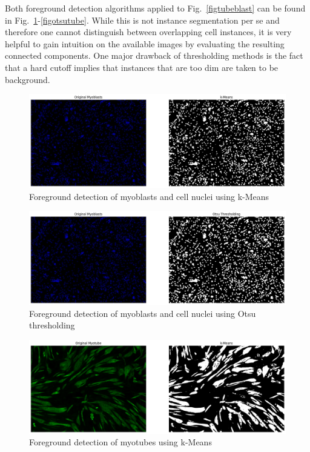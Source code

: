 Both foreground detection algorithms applied to Fig.~\ref{figtubeblast} can be found in Fig.~\ref{figkmblast}-\ref{figotsutube}. While this is not instance segmentation per se and therefore one cannot distinguish between overlapping cell instances, it is very helpful to gain intuition on the available images by evaluating the resulting connected components. One major drawback of thresholding methods is the fact that a hard cutoff implies that instances that are too dim are taken to be background.
\begin{figure}
	\centering
	\includegraphics[width=\textwidth]{"images/km_blast.png"}
	\caption[k-Means applied to nuclei]{Foreground detection of myoblasts and cell nuclei using k-Means}
	\label{figkmblast}
\end{figure}
\begin{figure}
	\centering
	\includegraphics[width=\textwidth]{"images/otsu_blast.png"}
	\caption[Otsu thresholding applied to nuclei]{Foreground detection of myoblasts and cell nuclei using Otsu thresholding}
	\label{figotsublast}
\end{figure}
\begin{figure}
	\centering
	\includegraphics[width=\textwidth]{"images/km_tube.png"}
	\caption[k-Means applied to myotubes]{Foreground detection of myotubes using k-Means}
	\label{figkmtube}
\end{figure}
